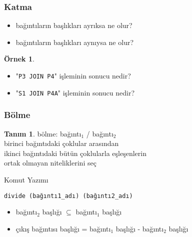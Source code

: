 \documentclass[dvipsnames]{beamer}
\theoremstyle{definition}
\newtheorem{tanim}[theorem]{Tanım}
\theoremstyle{example}
\newtheorem{ornek}[theorem]{Örnek}
\theoremstyle{plain}
\begin{document}
\begin{frame}
  \frametitle{Katma}

  \begin{itemize}
    \item bağıntıların başlıkları ayrıksa ne olur?
    \item bağıntıların başlıkları aynıysa ne olur?
  \end{itemize}

  \pause
  \begin{ornek}
    \begin{itemize}
      \item "\lstinline!P3 JOIN P4!" işleminin sonucu nedir?
      \item "\lstinline!S1 JOIN P4A!" işleminin sonucu nedir?
    \end{itemize}
  \end{ornek}
\end{frame}

\begin{frame}[fragile]
  \frametitle{Bölme}

  \begin{tanim}
    \alert{bölme}: bağıntı$_1$ / bağıntı$_2$\\
      birinci bağıntıdaki çoklular arasından\\
      ikinci bağıntıdaki bütün çoklularla eşleşenlerin\\
      ortak olmayan niteliklerini seç
  \end{tanim}

  \pause
  \begin{block}{Komut Yazımı}
    \begin{lstlisting}
divide (bağıntı1_adı) (bağıntı2_adı)
    \end{lstlisting}
  \end{block}

  \pause
  \begin{itemize}
    \item bağıntı$_2$ başlığı $\subseteq$ bağıntı$_1$ başlığı

    \pause
    \item çıkış bağıntısı başlığı = bağıntı${_1}$ başlığı - bağıntı${_2}$
      başlığı
  \end{itemize}
\end{frame}
\end{document}
